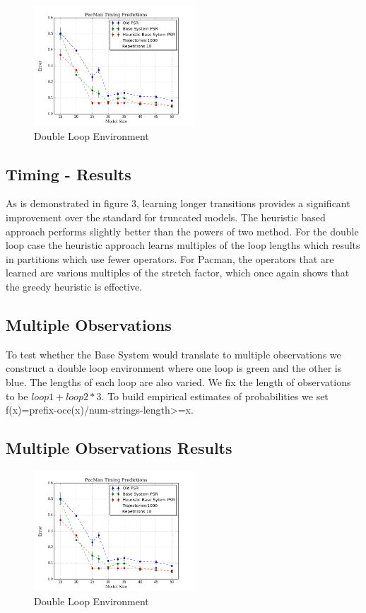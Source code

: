 \begin{figure}[ht!]
\centering
\includegraphics[width=60mm]{uCOREPICS/PacManTimingHeuristicsIncluded.png}
\caption{Double Loop Environment\label{overflow}}
\end{figure}

\subsection{Timing - Results}
As is demonstrated in figure 3, learning longer transitions provides a significant improvement over the standard for truncated models. The heuristic based approach performs slightly better than the powers of two method. For the double loop case the heuristic approach learns multiples of the loop lengths which results in partitions which use fewer operators. For Pacman, the operators that are learned are various multiples of the stretch factor, which once again shows that the greedy heuristic is effective. 

\subsection{Multiple Observations}

To test whether the Base System would translate to multiple observations we construct a double loop environment where one loop is green and the other is blue. The lengths of each loop are also varied. We fix the length of observations to be $loop1 + loop2 * 3$. To build empirical estimates of probabilities we set f(x)=prefix-occ(x)/num-strings-length>=x.

\subsection{Multiple Observations Results}

\begin{figure}[ht!]
\centering
\includegraphics[width=60mm]{uCOREPICS/PacManTimingHeuristicsIncluded.png}
\caption{Double Loop Environment\label{overflow}}
\end{figure}
